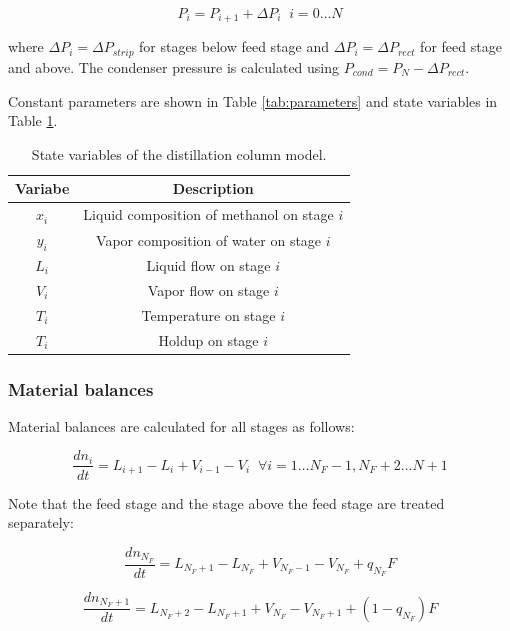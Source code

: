 \begin{equation}
    P_i = P_{i+1} + \Delta P_i \;\; i=0\dots N
\end{equation}

where $\Delta P_i =\Delta P_{strip}$ for stages below feed stage and $\Delta P_i =\Delta P_{rect}$ for feed stage and above. The condenser pressure is calculated using $P_{cond}=P_{N} - \Delta P_{rect}$.

Constant parameters are shown in Table \ref{tab:parameters} and state variables in Table \ref{tab:state_variables}.
\begin{table}
    \centering
    \caption{State variables of the distillation column model.}
    \begin{tabular}{cc}
        \textbf{Variabe} & \textbf{Description}  \\
        \hline
         $x_i$ &  Liquid composition of methanol on stage $i$ \\
         $y_i$ & Vapor composition of water on stage $i$\\
         $L_i$ & Liquid flow on stage $i$  \\
         $V_i$  & Vapor flow on stage $i$ \\
         $T_i$  & Temperature on stage $i$ \\
         $T_i$  & Holdup on stage $i$ \\
         \hline
    \end{tabular}
    
    \label{tab:state_variables}
\end{table}

\subsubsection{Material balances}
Material balances are calculated for all stages as follows:

\begin{equation}
\frac{dn_i}{dt} = L_{i+1}-L_i + V_{i-1}-V_i \;\; \forall i=1 \dots N_F-1, N_F+2 \dots N+1
\end{equation}

Note that the feed stage and the stage above the feed stage are treated separately:

\begin{equation}
    \frac{dn_{N_F}}{dt} = L_{N_F+1}-L_{N_F} + V_{N_F-1}-V_{N_F} + q_{N_F}F   
\end{equation}

\begin{equation}
   \frac{dn_{N_F+1}}{dt} = L_{N_F+2}-L_{N_F+1} + V_{N_F}-V_{N_F+1} + (1-q_{N_F})F 
\end{equation}


